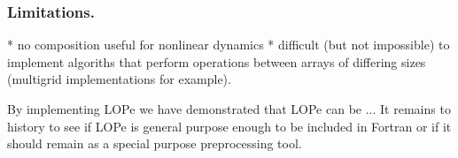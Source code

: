 \subsubsection{Limitations.}
* no composition useful for nonlinear dynamics\cite{coella}
* difficult (but not impossible) to implement algoriths that perform operations between arrays of
differing sizes (multigrid implementations for example).

By implementing LOPe
we have demonstrated that LOPe can be ... It remains to history to see if LOPe is general purpose
enough to be included in Fortran or if it should remain as a special purpose preprocessing tool.
